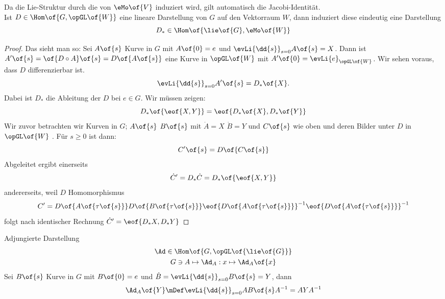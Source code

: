 	Da die Lie-Struktur durch die von $\eMo\of{V}$ induziert wird, gilt automatisch die Jacobi-Identität. \\
	Ist $D \in \Hom\of{G,\opGL\of{W}}$ eine lineare Darstellung von $G$ auf den Vektorraum $W$, dann induziert diese eindeutig eine Darstellung
	\begin{equation}
		D_{*} \in \Hom\of{\lie\of{G},\eMo\of{W}}
	\end{equation}
\begin{proof}
	Das sieht man so: Sei $A\of{s}$ Kurve in $G$ mit $A\of{0} = e$ und $\evLi{\dd{s}}_{s=0} A\of{s} = X$. Dann ist $A'\of{s} = \of{D\circ A}\of{s} = D\of{A\of{s}}$ eine Kurve in $\opGL\of{W}$ mit $A'\of{0} = \evLi{e}_{\opGL\of{W}}$. Wir sehen voraus, dass $D$ differenzierbar ist. 
	\begin{equation}
		\evLi{\dd{s}}_{s=0} A'\of{s} = D_{*}\of{X}.
	\end{equation}
	Dabei ist $D_{*}$ die Ableitung der \abb $D$ bei $e \in G$. Wir müssen zeigen:
	\begin{equation}
		D_{*}\of{\eof{X,Y}} = \eof{D_{*}\of{X},D_{*}\of{Y}}
	\end{equation}
	Wir zuvor betrachten wir Kurven in $G$; $A\of{s}$ $B\of{s}$ mit $\dot{A} = X$ $\dot{B} = Y$ und $C\of{s}$  wie oben und deren Bilder unter $D$ in $\opGL\of{W}$ . Für $s \geq 0$ ist dann:
	\begin{equation}
		C'\of{s} = D\of{C\of{s}}
	\end{equation}
	Abgeleitet ergibt einerseits
	\begin{equation}
		\dot{C}' = D_{*} \dot{C} = D_{*}\of{\eof{X,Y}}
	\end{equation}
	\newcommand{\oftau}{\of{\tau\of{s}}}
	andererseits, weil $D$ Homomorphismus 
	\begin{equation}
		C' = D\of{A\oftau}D\of{B\oftau}\eof{D\of{A\oftau}}^{-1}\eof{D\of{A\oftau}}^{-1}
	\end{equation}
	folgt nach identischer Rechnung $\dot{C}' = \eof{D_{*}X,D_{*}Y}$
\end{proof}
Adjungierte Darstellung
\begin{gather}
 \Ad \in \Hom\of{G,\opGL\of{\lie\of{G}}} \\
 G \owns A \mapsto \Ad_A : x \mapsto \Ad_A \of{x}
\end{gather}
Sei $B\of{s}$ Kurve in $G$ mit $B\of{0} = e$ und $\dot{B} = \evLi{\dd{s}}_{s=0} B\of{s} = Y$, dann 
\begin{equation}
	\Ad_A\of{Y} \mDef \evLi{\dd{s}}_{s=0} A B\of{s} A^{-1} = A Y A^{-1}
\end{equation}
